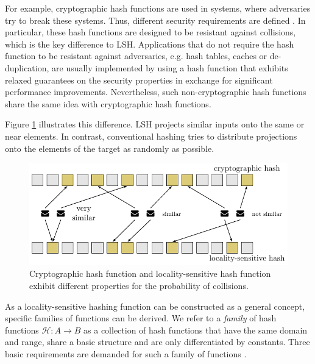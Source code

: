 For example, cryptographic hash functions are used in systems, where adversaries try to break these systems. Thus, different security requirements are defined \cite[349]{williamcryptography}. In particular, these hash functions are designed to be resistant against collisions, which is the key difference to LSH. Applications that do not require the hash function to be resistant against adversaries, e.g. hash tables, caches or de-duplication, are usually implemented by using a hash function that exhibits relaxed guarantees on the security properties in exchange for significant performance improvements. Nevertheless, such non-cryptographic hash functions share the same idea with cryptographic hash functions.

Figure \ref{fig:hashing_differences} illustrates this difference. LSH projects similar inputs onto the same or near elements. In contrast, conventional hashing tries to distribute projections onto the elements of the target as randomly as possible.

\begin{figure}[t!]
    \centering
    \includegraphics[width=0.8\linewidth]{tikz/hashing_differences.pdf}
    \caption{Cryptographic hash function and locality-sensitive hash function exhibit different properties for the probability of collisions.}
    \label{fig:hashing_differences}
\end{figure}







As a locality-sensitive hashing function can be constructed as a general concept, specific families of functions can be derived. We refer to a \textit{family} of hash functions $\mathcal{H}: A \rightarrow B$ as a collection of hash functions that have the same domain and range, share a basic structure and are only differentiated by constants. Three basic requirements are demanded for such a family of functions \cite[99]{leskovec_rajaraman_ullman_2014}.

